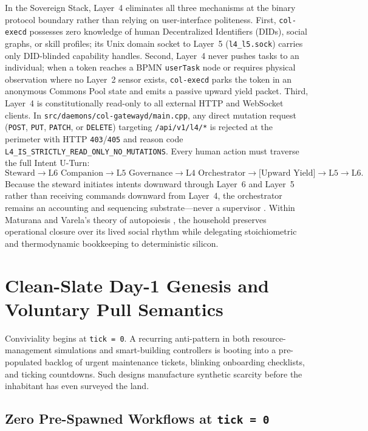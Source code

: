 In the Sovereign Stack, Layer~4 eliminates all three mechanisms at the binary protocol boundary rather than relying on user-interface politeness. First, \texttt{col-execd} possesses zero knowledge of human Decentralized Identifiers (DIDs), social graphs, or skill profiles; its Unix domain socket to Layer~5 (\texttt{l4\_l5.sock}) carries only DID-blinded capability handles. Second, Layer~4 never pushes tasks to an individual; when a token reaches a BPMN \texttt{userTask} node or requires physical observation where no Layer~2 sensor exists, \texttt{col-execd} parks the token in an anonymous Commons Pool state and emits a passive upward yield packet. Third, Layer~4 is constitutionally read-only to all external HTTP and WebSocket clients. In \texttt{src/daemons/col-gatewayd/main.cpp}, any direct mutation request (\texttt{POST}, \texttt{PUT}, \texttt{PATCH}, or \texttt{DELETE}) targeting \texttt{/api/v1/l4/*} is rejected at the perimeter with HTTP \texttt{403}/\texttt{405} and reason code \texttt{L4\_IS\_STRICTLY\_READ\_ONLY\_NO\_MUTATIONS}. Every human action must traverse the full Intent U-Turn:
\[
  \text{Steward} \longrightarrow \text{L6 Companion} \longrightarrow \text{L5 Governance} \longrightarrow \text{L4 Orchestrator} \longrightarrow \text{[Upward Yield]} \longrightarrow \text{L5} \longrightarrow \text{L6}.
\]
Because the steward initiates intents downward through Layer~6 and Layer~5 rather than receiving commands downward from Layer~4, the orchestrator remains an accounting and sequencing substrate---never a supervisor \parencite{habraken1972supports,ostrom1990}. Within Maturana and Varela's theory of autopoiesis \parencite{maturana1980}, the household preserves operational closure over its lived social rhythm while delegating stoichiometric and thermodynamic bookkeeping to deterministic silicon.

\section{Clean-Slate Day-1 Genesis and Voluntary Pull Semantics}
\label{sec:clean-slate-voluntary-pull}

Conviviality begins at \texttt{tick = 0}. A recurring anti-pattern in both resource-management simulations and smart-building controllers is booting into a pre-populated backlog of urgent maintenance tickets, blinking onboarding checklists, and ticking countdowns. Such designs manufacture synthetic scarcity before the inhabitant has even surveyed the land.

\subsection{Zero Pre-Spawned Workflows at \texttt{tick = 0}}

